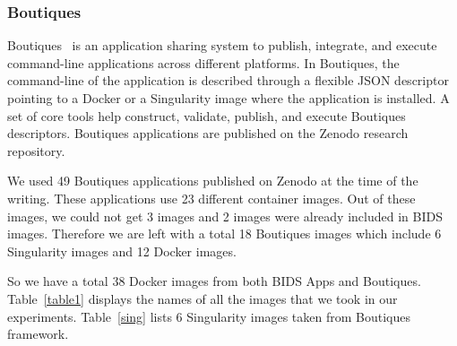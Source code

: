\documentclass[a4paper,num-refs]{oup-contemporary}
\begin{document}
\subsubsection{Boutiques}

Boutiques~\cite{glatard2018boutiques} is an application sharing system to
publish, integrate, and execute command-line applications across different
platforms. In Boutiques, the command-line of the application is described
through a flexible JSON descriptor pointing to a Docker or a Singularity
image where the application is installed. A set of core tools help
construct, validate, publish, and execute Boutiques descriptors. Boutiques
applications are published on the Zenodo research repository.

We used 49 Boutiques applications published on Zenodo at the time of
the writing. These applications use 23 different container images. Out of these images,
we could not get 3 images and 2 images were already included in BIDS images.
Therefore we are left with a total 18 Boutiques images which include 6
Singularity images and 12 Docker images.

So we have a total 38 Docker images from both BIDS Apps and Boutiques.
	Table~\ref{table1} displays the names of all the images that we took in our experiments.
Table~\ref{sing} lists 6 Singularity images taken from Boutiques framework.
\end{document}
